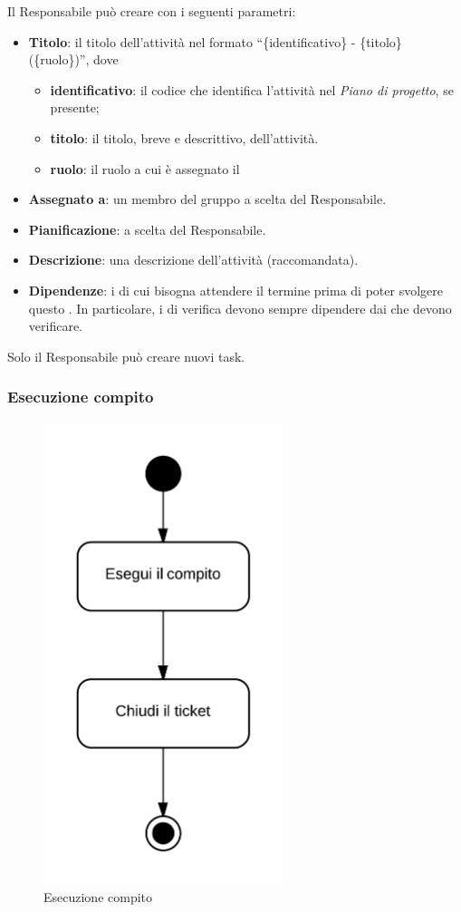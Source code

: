 Il Responsabile può creare  con i seguenti parametri:
\begin{itemize}
 \item \textbf{Titolo}: il titolo dell'attività nel formato ``\{identificativo\} - \{titolo\} (\{ruolo\})'', dove
	\begin{itemize}
		\item \textbf{identificativo}: il codice che identifica l'attività nel \emph{Piano di progetto}, se presente;
		\item \textbf{titolo}: il titolo, breve e descrittivo, dell'attività.
		\item \textbf{ruolo}: il ruolo a cui è assegnato il 
	\end{itemize}
 \item \textbf{Assegnato a}: un membro del gruppo a scelta del Responsabile.
 \item \textbf{Pianificazione}: a scelta del Responsabile.
 \item \textbf{Descrizione}: una descrizione dell'attività (raccomandata).
 \item \textbf{Dipendenze}: i  di cui bisogna attendere il termine prima di poter svolgere questo . In particolare, i  di verifica devono sempre dipendere dai  che devono verificare.
\end{itemize}

Solo il Responsabile può creare nuovi task.

\subsubsection{Esecuzione compito}

\begin{figure}[H]
    \centering
    \includegraphics[width=7cm]{uml-processi/esecuzione_compito.png}
    \caption{Esecuzione compito}
\end{figure}

